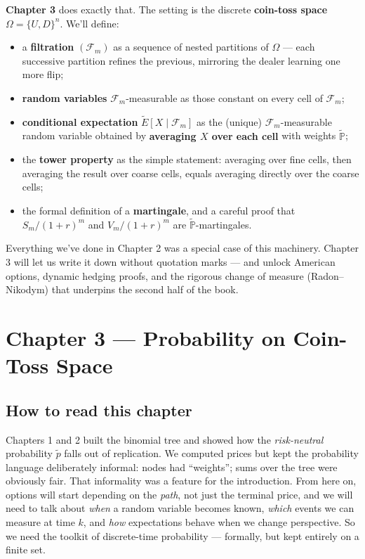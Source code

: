 \documentclass[
  10pt,
  twoside]{book}
\providecommand{\tightlist}{%
  \setlength{\itemsep}{0pt}\setlength{\parskip}{0pt}}
\begin{document}
\textbf{Chapter 3} does exactly that. The setting is the discrete
\textbf{coin-toss space} \(\Omega=\{U,D\}^n\). We'll define:

\begin{itemize}
\tightlist
\item
  a \textbf{filtration} \((\mathcal F_m)\) as a sequence of nested
  partitions of \(\Omega\) --- each successive partition refines the
  previous, mirroring the dealer learning one more flip;
\item
  \textbf{random variables} \(\mathcal F_m\)-measurable as those
  constant on every cell of \(\mathcal F_m\);
\item
  \textbf{conditional expectation} \(\tilde E[X\mid\mathcal F_m]\) as
  the (unique) \(\mathcal F_m\)-measurable random variable obtained by
  \textbf{averaging \(X\) over each cell} with weights
  \(\tilde{\mathbb P}\);
\item
  the \textbf{tower property} as the simple statement: averaging over
  fine cells, then averaging the result over coarse cells, equals
  averaging directly over the coarse cells;
\item
  the formal definition of a \textbf{martingale}, and a careful proof
  that \(S_m/(1+r)^m\) and \(V_m/(1+r)^m\) are
  \(\tilde{\mathbb P}\)-martingales.
\end{itemize}

Everything we've done in Chapter 2 was a special case of this machinery.
Chapter 3 will let us write it down without quotation marks --- and
unlock American options, dynamic hedging proofs, and the rigorous change
of measure (Radon--Nikodym) that underpins the second half of the book.

\newpage

\chapter{Chapter 3 --- Probability on Coin-Toss
Space}\label{chapter-3-probability-on-coin-toss-space}

\section{How to read this chapter}\label{how-to-read-this-chapter-2}

Chapters 1 and 2 built the binomial tree and showed how the
\emph{risk-neutral} probability \(\tilde p\) falls out of replication.
We computed prices but kept the probability language deliberately
informal: nodes had ``weights''; sums over the tree were obviously fair.
That informality was a feature for the introduction. From here on,
options will start depending on the \emph{path}, not just the terminal
price, and we will need to talk about \emph{when} a random variable
becomes known, \emph{which} events we can measure at time \(k\), and
\emph{how} expectations behave when we change perspective. So we need
the toolkit of discrete-time probability --- formally, but kept entirely
on a finite set.
\end{document}
